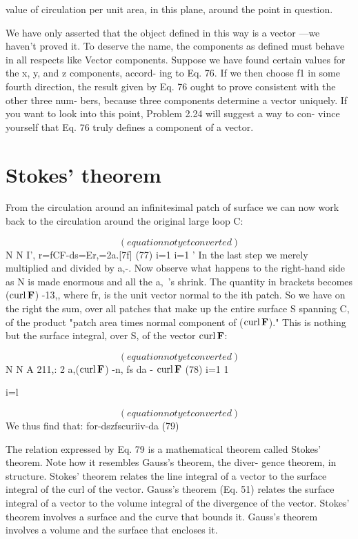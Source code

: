 value of circulation per unit area, in this plane, around the point in
question.

  
 

We have only asserted that the object defined in this way is a vector
---we haven't proved it. To deserve the name, the components as
defined must behave in all respects like Vector components. Suppose
we have found certain values for the x, y, and z components, accord-
ing to Eq. 76. If we then choose f1 in some fourth direction, the result
given by Eq. 76 ought to prove consistent with the other three num-
bers, because three components determine a vector uniquely. If you
want to look into this point, Problem 2.24 will suggest a way to con-
vince yourself that Eq. 76 truly defines a component of a vector.

\section{Stokes' theorem}

From the circulation around an infinitesimal patch of surface we
can now work back to the circulation around the original large
loop C:

\begin{equation}
(equation not yet converted)
\end{equation}
N N I',
r=fCF-ds=Er,=2a.[7f] (77)
i=1 i=1 '
In the last step we merely multiplied and divided by a,-. Now observe
what happens to the right-hand side as N is made enormous and all
the a,~'s shrink. The quantity in brackets becomes ($\operatorname{curl}\mathbf{F}$) -13,,
where fr, is the unit vector normal to the ith patch. So we have on
the right the sum, over all patches that make up the entire surface S
spanning C, of the product "patch area times normal component of
($\operatorname{curl}\mathbf{F}$)." This is nothing but the surface integral, over S, of the
vector $\operatorname{curl}\mathbf{F}$:

\begin{equation}
(equation not yet converted)
\end{equation}
N  N A
211,: 2 a,($\operatorname{curl}\mathbf{F}$) -n, \rightarrow fs da - $\operatorname{curl}\mathbf{F}$ (78)
i=1 1

i=l

\begin{equation}
(equation not yet converted)
\end{equation}
We thus find that:
for-dszfscuriiv-da (79)

The relation expressed by Eq. 79 is a mathematical theorem called
Stokes' theorem. Note how it resembles Gauss's theorem, the diver-
gence theorem, in structure. Stokes' theorem relates the line integral
of a vector to the surface integral of the curl of the vector. Gauss's
theorem (Eq. 51) relates the surface integral of a vector to the volume
integral of the divergence of the vector. Stokes' theorem involves
a surface and the curve that bounds it. Gauss's theorem involves a
volume and the surface that encloses it.

